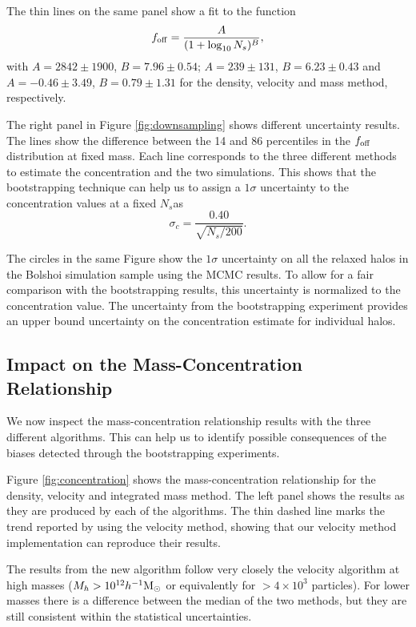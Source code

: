 \documentclass{emulateapj}
\newcommand{\hMsun}{{\ifmmode{h^{-1}{\rm {M_{\odot}}}}\else{$h^{-1}{\rm{M_{\odot}}}$}\fi}}
\begin{document}
The thin lines on the same panel show a fit to the function 
\begin{equation}
f_{\rm off} = \frac{A}{(1+\log_{10}N_s)^{B}},
\label{eq:f_off_fit}
\end{equation} 
%
with $A=2842\pm 1900$, $B=7.96\pm 0.54$; $A=239\pm 131$, $B=6.23\pm
0.43$ and $A=-0.46\pm 3.49$, $B=0.79\pm 1.31$ for the density,
velocity and mass method, respectively. 




The right panel in Figure \ref{fig:downsampling} shows different uncertainty
results.
The lines show the difference between the 14 and 86 percentiles in the
$f_{\rm off}$ distribution at fixed mass. 
Each line corresponds to the three different methods to estimate the
concentration and the two simulations.
This shows that the bootstrapping technique can help us to assign a
$1\sigma$ uncertainty to the concentration values at a fixed $N_s$as 
%
\begin{equation}
\sigma_{c} = \frac{0.40}{\sqrt{N_s/200}}.
\end{equation}
%

The circles in the same Figure show the $1\sigma$ uncertainty on all
the relaxed halos in the Bolshoi simulation sample using the MCMC
results.  
To allow for a fair comparison with the bootstrapping results, this
uncertainty is normalized to the concentration value.
The uncertainty from the bootstrapping experiment provides an upper
bound uncertainty on the concentration estimate for individual halos.  

 
 
\subsection{Impact on the Mass-Concentration Relationship}

We now inspect the mass-concentration relationship 
results with the three different algorithms.
This can help us to identify possible consequences of the 
biases detected through the bootstrapping experiments. 


Figure \ref{fig:concentration} shows the mass-concentration
relationship for the density, velocity and integrated mass method.
The left panel shows the results as they are produced by each of the
algorithms. The thin dashed line marks the trend reported by
\citep{Prada2012} using the velocity method, showing that our
velocity method implementation can reproduce their results. 

The results from the new algorithm follow very
closely the velocity algorithm at high masses ($M_h>10^{12}\hMsun$ or
equivalently for $>4\times10^3$ particles). 
For lower masses there is a difference between the median of the two
methods, but they are still consistent within the statistical
uncertainties.
\end{document}
